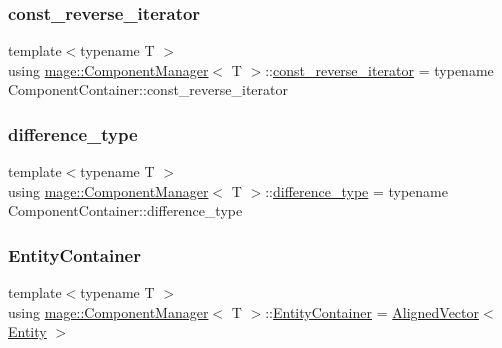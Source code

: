 \mbox{\label{classmage_1_1_component_manager_a00481d8beab5d950124f54c0f832da53}} 
\subsubsection{\texorpdfstring{const\+\_\+reverse\+\_\+iterator}{const\_reverse\_iterator}}
{\footnotesize\ttfamily template$<$typename T $>$ \\
using \mbox{\hyperlink{classmage_1_1_component_manager}{mage\+::\+Component\+Manager}}$<$ T $>$\+::\mbox{\hyperlink{classmage_1_1_component_manager_a00481d8beab5d950124f54c0f832da53}{const\+\_\+reverse\+\_\+iterator}} =  typename Component\+Container\+::const\+\_\+reverse\+\_\+iterator}

\mbox{\label{classmage_1_1_component_manager_af276ec057e09efba9b826aff4f45cdc2}} 
\subsubsection{\texorpdfstring{difference\+\_\+type}{difference\_type}}
{\footnotesize\ttfamily template$<$typename T $>$ \\
using \mbox{\hyperlink{classmage_1_1_component_manager}{mage\+::\+Component\+Manager}}$<$ T $>$\+::\mbox{\hyperlink{classmage_1_1_component_manager_af276ec057e09efba9b826aff4f45cdc2}{difference\+\_\+type}} =  typename Component\+Container\+::difference\+\_\+type}

\mbox{\label{classmage_1_1_component_manager_a1778c10d17301f112ee99d6daf3e55a7}} 
\subsubsection{\texorpdfstring{Entity\+Container}{EntityContainer}}
{\footnotesize\ttfamily template$<$typename T $>$ \\
using \mbox{\hyperlink{classmage_1_1_component_manager}{mage\+::\+Component\+Manager}}$<$ T $>$\+::\mbox{\hyperlink{classmage_1_1_component_manager_a1778c10d17301f112ee99d6daf3e55a7}{Entity\+Container}} =  \mbox{\hyperlink{namespacemage_a8664bfb5ce2179fc64eae9f82c8a5ba8}{Aligned\+Vector}}$<$ \mbox{\hyperlink{classmage_1_1_entity}{Entity}} $>$}

